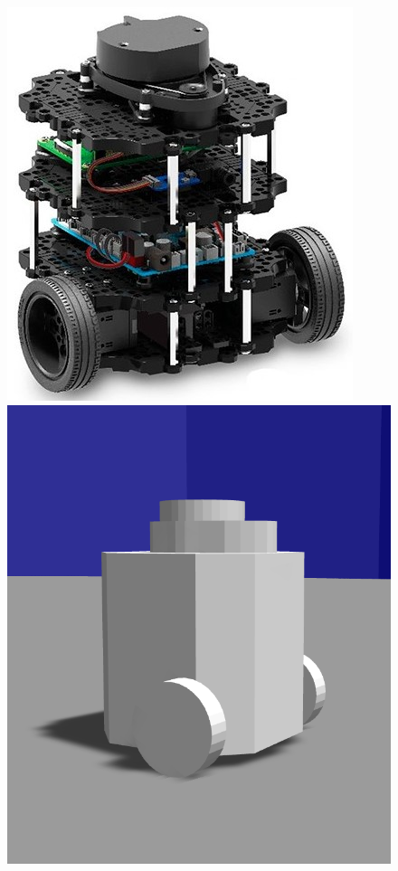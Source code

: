 \documentclass[conference]{IEEEtran}
\begin{document}
\begin{figure}[h]
    \centering
    \begin{minipage}{.4\columnwidth}
        \centering
        \includegraphics[width=\textwidth]{images/turtlebot3-burger.jpg}
    \end{minipage}%
    \begin{minipage}{.4\columnwidth}
        \centering
        \includegraphics[width=\textwidth]{images/turtlebot3-burger-gazebo.png}

\end{minipage}
\end{figure}
\end{document}
